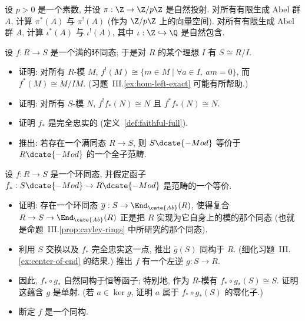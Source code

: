 \begin{prob}\label{ex:base-change-z-fp}
设 $p>0$ 是一个素数, 并设 $\pi:\Z\to\Z/p\Z$ 是自然投射. 对所有有限生成 Abel 群 $A$, 计算 $\pi^*(A)$ 与 $\pi^!(A)$ (作为 $\Z/p\Z$ 上的向量空间). 对所有有限生成 Abel 群 $A$, 计算 $\iota^*(A)$ 与 $\iota^!(A)$, 其中 $\iota:\Z\hookrightarrow\Q$ 是自然包含.
\end{prob}

\begin{prob}\label{ex:quotient-base-change}
设 $f:R\to S$ 是一个满的环同态; 于是对 $R$ 的某个理想 $I$ 有 $S\cong R/I$.
\begin{itemize}
\item 证明: 对所有 $R$-模 $M$, $f^!(M)\cong\{m\in M\mid \forall a\in I,\ am=0\}$, 而 $f^*(M)\cong M/IM$. (习题~III.\ref{ex:hom-left-exact} 可能有所帮助.)
\item 证明: 对所有 $S$-模 $N$, $f^!f_*(N)\cong N$ 且 $f^*f_*(N)\cong N$.
\item 证明 $f_*$ 是完全忠实的 (定义~\ref{def:faithful-full}).
\item 推出: 若存在一个满同态 $R\to S$, 则 $S\dcate{-Mod}$ 等价于 $R\dcate{-Mod}$ 的一个全子范畴.
\end{itemize}
\end{prob}

\begin{prob}\label{ex:morita-commutative}
设 $f:R\to S$ 是一个环同态, 并假定函子 $f_*:S\dcate{-Mod}\to R\dcate{-Mod}$ 是范畴的一个等价.
\begin{itemize}
\item 证明: 存在一个环同态 $\overline{g}:S\to\End_{\cate{Ab}}(R)$, 使得复合 $R\to S\to\End_{\cate{Ab}}(R)$ 正是把 $R$ 实现为它自身上的模的那个同态 (也就是命题~III.\ref{prop:cayley-rings} 中所研究的那个同态).
\item 利用 $S$ 交换以及 $f_*$ 完全忠实这一点, 推出 $\overline{g}(S)$ 同构于 $R$. (细化习题~III.\ref{ex:center-of-end} 的结果.) 推出 $f$ 有一个左逆 $g:S\to R$.
\item 因此, $f_*\circ g_*$ 自然同构于恒等函子; 特别地, 作为 $R$-模有 $f_*\circ g_*(S)\cong S$. 证明这蕴含 $g$ 是单射. (若 $a\in\ker g$, 证明 $a$ 属于 $f_*\circ g_*(S)$ 的零化子.)
\item 断定 $f$ 是一个同构.
\end{itemize}
\end{prob}

